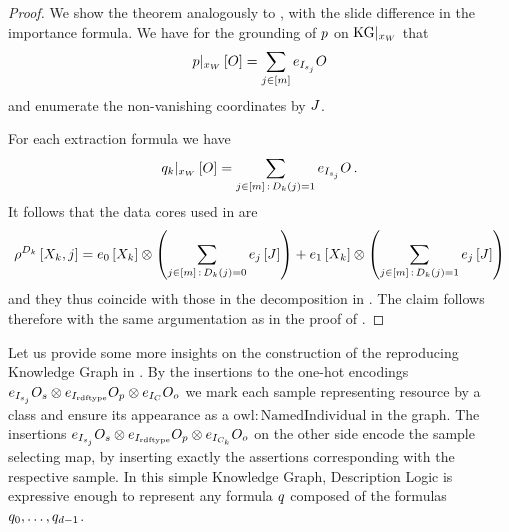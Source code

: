 \begin{proof}
    We show the theorem analogously to , with the slide difference in the importance formula.
    We have for the grounding of $p$ on $\mathrm{KG}|_{x_{W}}$ that
    \begin{align*}
        {p}|_{x_{W}}\left[O\right] = \sum_{j\in[m]}  e_{I_{s_j}}{O}
    \end{align*}
    and enumerate the non-vanishing coordinates by $J$.

    For each extraction formula we have
    \begin{align*}
        {q_{k}}|_{x_{W}}\left[O\right] = \sum_{j\in[m] \, : \, D_{k}(j)=1} e_{I_{s_j}}{O} \,.
    \end{align*}
    It follows that the data cores used in  are
    \begin{align*}
        \rho^{D_k}\left[X_{k},j\right]
        = e_{0}\left[X_{k}\right] \otimes \left(\sum_{j\in[m] \, : \, D_{k}(j)=0} e_{j}\left[J\right]\right)
        +e_{1}\left[X_{k}\right] \otimes \left(\sum_{j\in[m] \, : \, D_{k}(j)=1} e_{j}\left[J\right]\right)
    \end{align*}
    and they thus coincide with those in the decomposition in .
    The claim follows therefore with the same argumentation as in the proof of .
\end{proof}

%
Let us provide some more insights on the construction of the reproducing Knowledge Graph in .
By the insertions to the one-hot encodings $e_{I_{s_j}}{O_{s}} \otimes e_{I_{\mathrm{rdftype}}}{O_{p}} \otimes e_{I_{C}}{O_{o}}$ we mark each sample representing resource by a class and ensure its appearance as a $\mathrm{owl:NamedIndividual}$ in the graph.
The insertions $e_{I_{s_j}}{O_{s}}\otimes e_{I_{\mathrm{rdftype}}}{O_{p}} \otimes e_{I_{C_k}}{O_{o}}$ on the other side encode the sample selecting map, by inserting exactly the assertions corresponding with the respective sample.
% 
In this simple Knowledge Graph, Description Logic is expressive enough to represent any formula $q$ composed of the formulas $q_{0},\ldots,q_{d-1}$.

